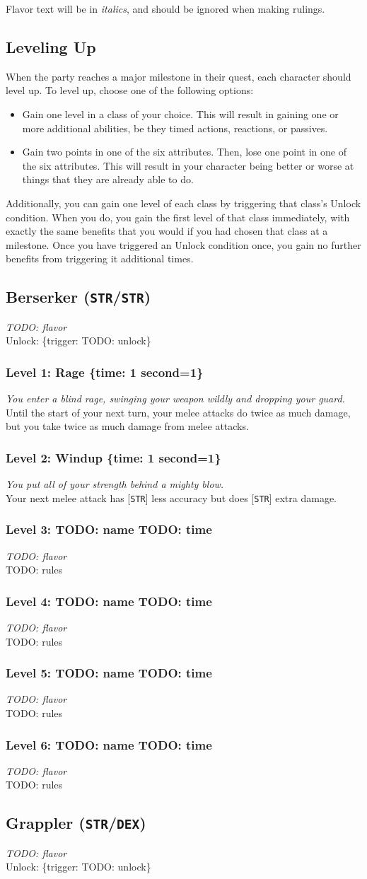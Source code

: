\documentclass[12pt]{article}
\newcommand{\STR}{\texttt{STR}}
\newcommand{\DEX}{\texttt{DEX}}
\newcommand{\TIME}[1]{\{time: #1 second\if1=#1{}\else{s}\fi\}}
\newcommand{\TRIG}[1]{\{trigger: #1\}}
\newcommand{\Class}[4]{\pagebreak\subsection{#1 (#2)}\label{#1}\textit{#3}\\[1mm]Unlock: \TRIG{#4}}
\newcommand{\Skill}[5]{\subsubsection{Level #1: #2 #3}\textit{#4}\\[1mm]#5}
\begin{document}
Flavor text will be in \textit{italics}, and should be ignored when making rulings.

\subsection{Leveling Up}

When the party reaches a major milestone in their quest, each character should level up. To level up, choose one of the following options:
\begin{itemize}
\item Gain one level in a class of your choice. This will result in gaining one or more additional abilities, be they timed actions, reactions, or passives.
\item Gain two points in one of the six attributes. Then, lose one point in one of the six attributes. This will result in your character being better or worse at things that they are already able to do.
\end{itemize}

Additionally, you can gain one level of each class by triggering that class's Unlock condition. When you do, you gain the first level of that class immediately, with exactly the same benefits that you would if you had chosen that class at a milestone. Once you have triggered an Unlock condition once, you gain no further benefits from triggering it additional times.

%

\Class{Berserker}{\STR/\STR}
{TODO: flavor}
{TODO: unlock}

\Skill{1}{Rage}{\TIME{1}}
{You enter a blind rage, swinging your weapon wildly and dropping your guard.}
{Until the start of your next turn, your melee attacks do twice as much damage, but you take twice as much damage from melee attacks.}

\Skill{2}{Windup}{\TIME{1}}
{You put all of your strength behind a mighty blow.}
{Your next melee attack has [\STR] less accuracy but does [\STR] extra damage.}

\Skill{3}{TODO: name}{TODO: time}
{TODO: flavor}
{TODO: rules}

\Skill{4}{TODO: name}{TODO: time}
{TODO: flavor}
{TODO: rules}

\Skill{5}{TODO: name}{TODO: time}
{TODO: flavor}
{TODO: rules}

\Skill{6}{TODO: name}{TODO: time}
{TODO: flavor}
{TODO: rules}

%

\Class{Grappler}{\STR/\DEX}
{TODO: flavor}
{TODO: unlock}
\end{document}
